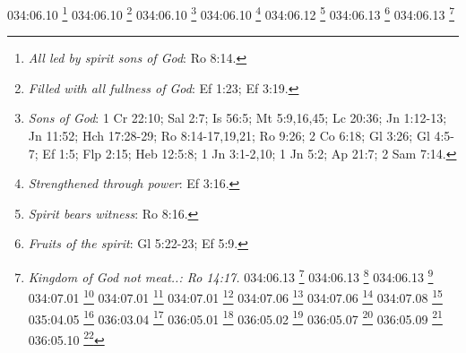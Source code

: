 {{{{{{{{{{{{{{{{{{{{{034:06.10 \footnote{\textit{All led by spirit sons of God}: Ro 8:14.}
034:06.10 \footnote{\textit{Filled with all fullness of God}: Ef 1:23; Ef 3:19.}
034:06.10 \footnote{\textit{Sons of God}: 1 Cr 22:10; Sal 2:7; Is 56:5; Mt 5:9,16,45; Lc 20:36; Jn 1:12-13; Jn 11:52; Hch 17:28-29; Ro 8:14-17,19,21; Ro 9:26; 2 Co 6:18; Gl 3:26; Gl 4:5-7; Ef 1:5; Flp 2:15; Heb 12:5:8; 1 Jn 3:1-2,10; 1 Jn 5:2; Ap 21:7; 2 Sam 7:14.}
034:06.10 \footnote{\textit{Strengthened through power}: Ef 3:16.}
034:06.12 \footnote{\textit{Spirit bears witness}: Ro 8:16.}
034:06.13 \footnote{\textit{Fruits of the spirit}: Gl 5:22-23; Ef 5:9.}
034:06.13 \footnote{\textit{Kingdom of God not meat..: Ro 14:17.}
034:06.13 \footnote{\textit{Kingdom of God}: Mt 6:33; Mt 12:28; Mt 19:24; Mt 21:31,43; Mc 1:14-15; Mc 4:11,26,30; Mc 9:1,47; Mc 10:14-15,23-25; Mc 12:34; Mc 14:25; Mc 15:43; Lc 4:43; Lc 6:20; Lc 7:28; Lc 8:1,10; Lc 9:2,11,27; Lc 9:60,62; Lc 10:9-11; Lc 11:20; Lc 12:31-32; Lc 13:18,20,28,29; Lc 14:15; Lc 16:16; Lc 17:20-21; Lc 18:16-17,24-25; Lc 19:11; Lc 21:31; Lc 22:16-18; Lc 23:51; Jn 3:3,5; Ro 14:17; 1 Co 4:20; 1 Co 6:9-10.}
034:06.13 \footnote{\textit{Kingdom of heaven}: Mt 3:2; Mt 4:17; Mt 5:3,10,19-20; Mt 7:21; Mt 8:11; Mt 10:7; Mt 11:11-12; Mt 13:11,24,31-52; Mt 16:19; Mt 18:1-4,23; Mt 19:14,23; Mt 20:1; Mt 22:2; Mt 23:13; Mt 25:1,14.}
034:06.13 \footnote{\textit{Kingdom}: Mt 4:23; Mt 9:35; Mt 24:14.}
034:07.01 \footnote{\textit{Fruits of the spirit}: Gl 5:22-23; Ef 5:9.}
034:07.01 \footnote{\textit{Spirit of Truth}: Ez 11:19; Ez 18:31; Ez 36:26-27; Jl 2:28-29; Lc 24:49; Jn 7:39; Jn 14:16-18,23,26; Jn 15:4,26; Jn 16:7-8,13-14; Jn 17:21-23; Hch 1:5,8a; Hch 2:1-4,16-18; Hch 2:33; 2 Co 13:5; Gl 2:20; Gl 4:6; Ef 1:13; Ef 4:30; 1 Jn 4:12-15.}
034:07.01 \footnote{\textit{Spirit will guide you to truth}: Jn 16:13.}
034:07.06 \footnote{\textit{Faith is victor over flesh}: 1 Jn 5:4.}
034:07.06 \footnote{\textit{Spirit of the life of Jesus}: Ro 8:2.}
034:07.08 \footnote{\textit{This is the way}: Is 30:21.}
035:04.05 \footnote{\textit{Melchizedek, Prince of Salem}: Gn 14:18; Heb 7:1-3.}
036:03.04 \footnote{\textit{Vital spark--mystery of life}: Sal 119:93; Jn 5:21; Jn 6:63; 1 Ti 6:13.}
036:05.01 \footnote{\textit{Adjutant mind spirits}: Is 11:2; Ap 1:4; Ap 3:1; Ap 4:5; Ap 5:6.}
036:05.02 \footnote{\textit{Adjutant mind spirits}: Is 11:2; Ap 1:4; Ap 3:1; Ap 4:5; Ap 5:6.}
036:05.07 \footnote{\textit{Spirit of understanding}: Ex 31:3; Ex 35:31; Job 32:8; Eclo 1:4; Is 11:2; Dn 5:11-12,14.}
036:05.09 \footnote{\textit{Spirit of knowledge}: Ex 31:3; Ex 35:31; Is 11:2; Ef 1:17.}
036:05.10 \footnote{\textit{Spirit of counsel}: Is 11:2.}
}}}}}}}}}}}}}}}}}}}}}}
